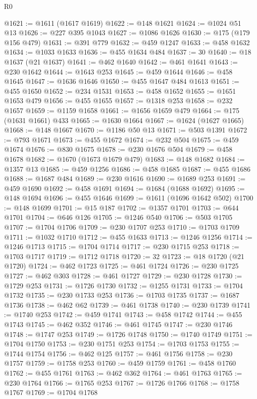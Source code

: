 \begin{lexlean}{R0}
\begin{coremodule}
@1621 := @1611 (@1617 @1619)
@1622 := @148 @1621
@1624 := @1024 @51 @13
@1626 := @227 @395 @1043
@1627 := @1086 @1626
@1630 := @175 (@179 @156 @479)
@1631 := @391 @779
@1632 := @459 @1247
@1633 := @458 @1632
@1634 := @1033 @1633
@1636 := @455 @1634 @484
@1637 := 30
@1640 := @18 @1637 (@21 @1637)
@1641 := @462 @1640
@1642 := @461 @1641
@1643 := @230 @1642
@1644 := @1643 @253
@1645 := @459 @1644
@1646 := @458 @1645
@1647 := @1636 @1646
@1650 := @455 @1647 @484 @1613
@1651 := @455 @1650
@1652 := @234 @1531
@1653 := @458 @1652
@1655 := @1651 @1653 @479
@1656 := @455 @1655
@1657 := @1318 @253
@1658 := @232 @1657
@1659 := @1159 @1658
@1661 := @1656 @1659 @479
@1664 := @175 (@1631 @1661) @433
@1665 := @1630 @1664
@1667 := @1624 (@1627 @1665)
@1668 := @148 @1667
@1670 := @1186 @50 @13
@1671 := @503 @1391
@1672 := @793 @1671
@1673 := @455 @1672
@1674 := @232 @504
@1675 := @459 @1674
@1676 := @830 @1675
@1678 := @230 @1676 @504
@1679 := @458 @1678
@1682 := @1670 (@1673 @1679 @479)
@1683 := @148 @1682
@1684 := @1357 @13
@1685 := @459 @1256
@1686 := @458 @1685
@1687 := @455 @1686
@1688 := @1687 @484
@1689 := @230 @1616
@1690 := @1689 @253
@1691 := @459 @1690
@1692 := @458 @1691
@1694 := @1684 (@1688 @1692)
@1695 := @148 @1694
@1696 := @455 @1646
@1699 := @1611 (@1696 @1642 @502)
@1700 := @148 @1699
@1701 := @15 @187
@1702 := @1357 @1701
@1703 := @644 @1701
@1704 := @646 @126
@1705 := @1246 @540
@1706 := @503 @1705
@1707 := @1704 @1706
@1709 := @230 @1707 @253
@1710 := @1703 @1709
@1711 := @1032 @1710
@1712 := @455 @1633
@1713 := @1246 @1256
@1714 := @1246 @1713
@1715 := @1704 @1714
@1717 := @230 @1715 @253
@1718 := @1703 @1717
@1719 := @1712 @1718
@1720 := 32
@1723 := @18 @1720 (@21 @1720)
@1724 := @462 @1723
@1725 := @461 @1724
@1726 := @230 @1725
@1727 := @462 @303
@1728 := @461 @1727
@1729 := @230 @1728
@1730 := @1729 @253
@1731 := @1726 @1730
@1732 := @1255 @1731
@1733 := @1704 @1732
@1735 := @230 @1733 @253
@1736 := @1703 @1735
@1737 := @1687 @1736
@1738 := @462 @62
@1739 := @461 @1738
@1740 := @230 @1739
@1741 := @1740 @253
@1742 := @459 @1741
@1743 := @458 @1742
@1744 := @455 @1743
@1745 := @462 @352
@1746 := @461 @1745
@1747 := @230 @1746
@1748 := @1747 @253
@1749 := @1726 @1748
@1750 := @1740 @1749
@1751 := @1704 @1750
@1753 := @230 @1751 @253
@1754 := @1703 @1753
@1755 := @1744 @1754
@1756 := @462 @125
@1757 := @461 @1756
@1758 := @230 @1757
@1759 := @1758 @253
@1760 := @459 @1759
@1761 := @458 @1760
@1762 := @455 @1761
@1763 := @462 @362
@1764 := @461 @1763
@1765 := @230 @1764
@1766 := @1765 @253
@1767 := @1726 @1766
@1768 := @1758 @1767
@1769 := @1704 @1768

\end{coremodule}
\end{lexlean}
